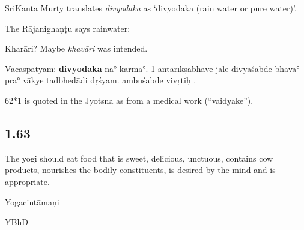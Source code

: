 \begin{ekdosis}
\begin{philcomm}[hp01_062]
SriKanta Murty translates \emph{divyodaka} as ‘divyodaka (rain water or pure water)'.

The Rājanighaṇṭu says rainwater:

\begin{versinnote}
\end{versinnote}

Kharāri? Maybe \emph{khavāri} was intended.

Vācaspatyam:
\textbf{divyodaka} na° karma°.
1 antarīkṣabhave jale divyaśabde bhāva° pra° vākye tadbhedādi dṛśyam.
ambuśabde vivṛtiḥ .

62*1 is quoted in the Jyotsna as from a medical work (“vaidyake”).
\end{philcomm}

\subsection*{1.63}
\begin{translation}[hp01_063]
The yogi should eat food that is sweet, delicious, unctuous, contains cow products, nourishes the bodily constituents, is desired by the mind and is appropriate.
\end{translation}

\begin{sources}[hp01_063]
\end{sources}

\begin{testimonia}[hp01_063]
Yogacintāmaṇi

\begin{versinnote}
\end{versinnote}

YBhD

\begin{versinnote}
\end{versinnote}

\end{testimonia}


\end{ekdosis}
